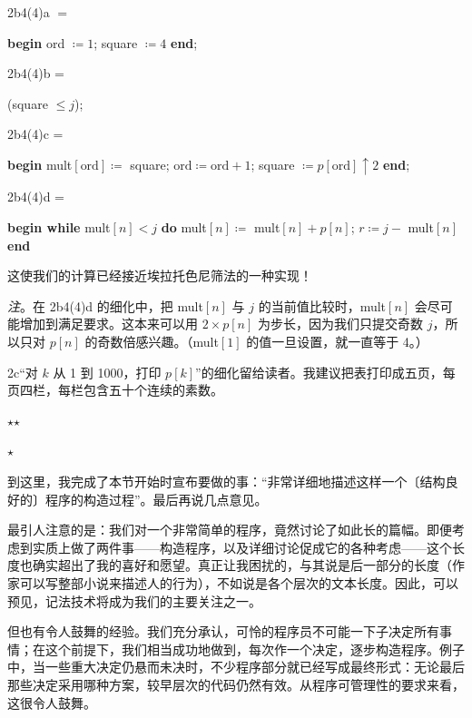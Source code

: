 \documentclass[twoside,11pt,fontset=none]{ctexbook}
\begin{document}
\noindent
2b4(4)a $=$

\noindent
\textbf{begin} ord $\coloneq 1$; square $\coloneq 4$ \textbf{end};

\noindent
2b4(4)b =

\noindent
\quad (square $\leqslant j$);

\noindent
2b4(4)c =

\noindent
\textbf{begin} mult$[\text{ord}] \coloneq$ square; $\text{ord} \coloneq \text{ord} + 1$; square $\coloneq p[\text{ord}] \uparrow 2$ \textbf{end};

\noindent
2b4(4)d =

\noindent
\textbf{begin while} mult$[n] < j$ \textbf{do} mult$[n]\coloneq$ mult$[n] + p[n]$; $r\coloneq j -$ mult$[n]$ \textbf{end}

\noindent
这使我们的计算已经接近埃拉托色尼筛法的一种实现！

\noindent
\textit{注}。在 2b4(4)d 的细化中，把 mult$[n]$ 与 $j$ 的当前值比较时，mult$[n]$ 会尽可能增加到满足要求。这本来可以用 $2\times p[n]$ 为步长，因为我们只提交奇数 $j$，所以只对 $p[n]$ 的奇数倍感兴趣。（mult$[1]$ 的值一旦设置，就一直等于 4。）

2c“对 $k$ 从 1 到 1000，打印 $p[k]$”的细化留给读者。我建议把表打印成五页，每页四栏，每栏包含五十个连续的素数。

\vspace*{-1em}
\begin{center}
	$\star$\quad\quad  $\star$\\
	\nopagebreak
	
	\vspace*{-.5em}
	$\star$
\end{center}
\vspace*{-1em}

到这里，我完成了本节开始时宣布要做的事：“非常详细地描述这样一个〔结构良好的〕程序的构造过程”。最后再说几点意见。

最引人注意的是：我们对一个非常简单的程序，竟然讨论了如此长的篇幅。即便考虑到实质上做了两件事——构造程序，以及详细讨论促成它的各种考虑——这个长度也确实超出了我的喜好和愿望。真正让我困扰的，与其说是后一部分的长度（作家可以写整部小说来描述人的行为），不如说是各个层次的文本长度。因此，可以预见，记法技术将成为我们的主要关注之一。

但也有令人鼓舞的经验。我们充分承认，可怜的程序员不可能一下子决定所有事情；在这个前提下，我们相当成功地做到，每次作一个决定，逐步构造程序。例子中，当一些重大决定仍悬而未决时，不少程序部分就已经写成最终形式：无论最后那些决定采用哪种方案，较早层次的代码仍然有效。从程序可管理性的要求来看，这很令人鼓舞。
\end{document}

